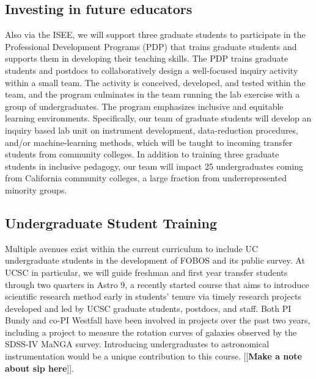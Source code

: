 \documentclass[oneside,11pt]{amsart}
\newcommand{\comment}[2][todo]{{\color{#1}[[{\bf #2}]]}}
\begin{document}
\subsection{Investing in future educators} Also via the ISEE, we will
support three graduate students to participate in the Professional
Development Programs (PDP) that trains graduate students and supports
them in developing their teaching skills.  The PDP trains graduate
students and postdocs to collaboratively design a well-focused inquiry
activity within a small team.  The activity is conceived, developed, and
tested within the team, and the program culminates in the team running
the lab exercise with a group of undergraduates.  The program emphasizes
inclusive and equitable learning environments.  Specifically, our team
of graduate students will develop an inquiry based lab unit on
instrument development, data-reduction procedures, and/or
machine-learning methods, which will be taught to incoming transfer
students from community colleges.  In addition to training three
graduate students in inclusive pedagogy, our team will impact 25
undergraduates coming from California community colleges, a large
fraction from underrepresented minority groups.

\subsection{Undergraduate Student Training} Multiple avenues exist
within the current curriculum to include UC undergraduate students in
the development of FOBOS and its public survey.  At UCSC in particular,
we will guide freshman and first year transfer students through two
quarters in Astro 9, a recently started course that aims to introduce
scientific research method early in students' tenure via timely research
projects developed and led by UCSC graduate students, postdocs, and
staff.  Both PI Bundy and co-PI Westfall have been involved in projects
over the past two years, including a project to measure the rotation
curves of galaxies observed by the SDSS-IV MaNGA survey.  Introducing
undergraduates to astronomical instrumentation would be a unique
contribution to this course.
\comment{Make a note about sip here}.


\end{document}

